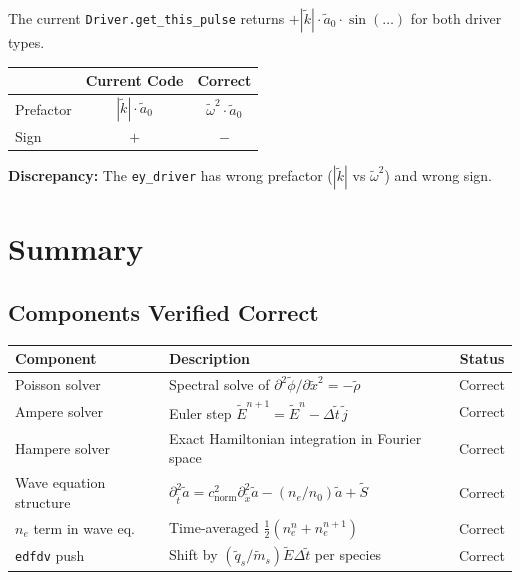 \documentclass[11pt]{article}
\newcommand{\tl}[1]{\tilde{#1}}
\newcommand{\cnorm}{c_{\text{norm}}}
\newcommand{\code}[1]{\texttt{#1}}
\newcommand{\tq}{\tl{q}}
\newcommand{\tm}{\tl{m}}
\begin{document}
The current \code{Driver.get\_this\_pulse} returns $+|\tl{k}| \cdot \tl{a}_0 \cdot \sin(\ldots)$ for both driver types.

\begin{center}
\renewcommand{\arraystretch}{1.4}
\begin{tabular}{lcc}
\toprule
& \textbf{Current Code} & \textbf{Correct} \\
\midrule
Prefactor & $|\tl{k}| \cdot \tl{a}_0$ & $\tl{\omega}^2 \cdot \tl{a}_0$ \\
Sign & $+$ & $-$ \\
\bottomrule
\end{tabular}
\end{center}

\begin{center}
\colorbox{red!15}{\parbox{0.85\textwidth}{
\textbf{Discrepancy:} The \code{ey\_driver} has wrong prefactor ($|\tl{k}|$ vs $\tl{\omega}^2$) and wrong sign.
}}
\end{center}

\newpage
\section{Summary}

\subsection{Components Verified Correct}

\begin{center}
\renewcommand{\arraystretch}{1.4}
\begin{tabular}{lp{8cm}c}
\toprule
\textbf{Component} & \textbf{Description} & \textbf{Status} \\
\midrule
Poisson solver & Spectral solve of $\partial^2\tl\phi/\partial\tl{x}^2 = -\tl\rho$ & \colorbox{green!20}{Correct} \\
Ampere solver & Euler step $\tl{E}^{n+1} = \tl{E}^n - \Delta\tl{t}\,\tl{j}$ & \colorbox{green!20}{Correct} \\
Hampere solver & Exact Hamiltonian integration in Fourier space & \colorbox{green!20}{Correct} \\
Wave equation structure & $\partial^2_{\tl{t}} \tl{a} = \cnorm^2 \partial^2_{\tl{x}} \tl{a} - (n_e/n_0)\tl{a} + \tl{S}$ & \colorbox{green!20}{Correct} \\
$n_e$ term in wave eq. & Time-averaged $\frac{1}{2}(n_e^n + n_e^{n+1})$ & \colorbox{green!20}{Correct} \\
\code{edfdv} push & Shift by $(\tq_s/\tm_s) \tl{E} \Delta\tl{t}$ per species & \colorbox{green!20}{Correct} \\
\bottomrule
\end{tabular}
\end{center}
\end{document}

